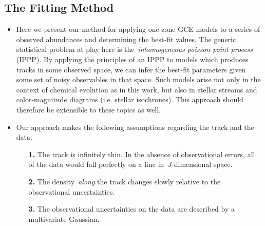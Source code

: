 \documentclass[ms.tex]{subfiles}
\begin{document}
\subsection{The Fitting Method}
\label{sec:methods:fitting}

\begin{itemize}

	\item Here we present our method for applying one-zone GCE models to a
	series of observed abundances and determining the best-fit values.
	The generic statistical problem at play here is the~\textit{inhomogeneous
	poisson point process} (IPPP).
	By applying the principles of an IPPP to models which produces tracks in
	some observed space, we can infer the best-fit parameters given some set
	of noisy observables in that space.
	Such models arise not only in the context of chemical evolution as in this
	work, but also in stellar streams and color-magnitude diagrams (i.e.
	stellar isochrones).
	This approach should therefore be extensible to these topics as well.


	\item Our approach makes the following assumptions regarding the track and
	the data:
	\begin{itemize}

		\item[\textbf{1.}] The track is infinitely thin. In the absence of
		observational errors, all of the data would fall perfectly on a line
		in~$J$-dimensional space.

		\item[\textbf{2.}] The density~\textit{along} the track changes slowly
		relative to the observational uncertainties.

		\item[\textbf{3.}] The observational uncertainties on the data are
		described by a multivariate Gaussian.


\end{itemize}
\end{itemize}
\end{document}
